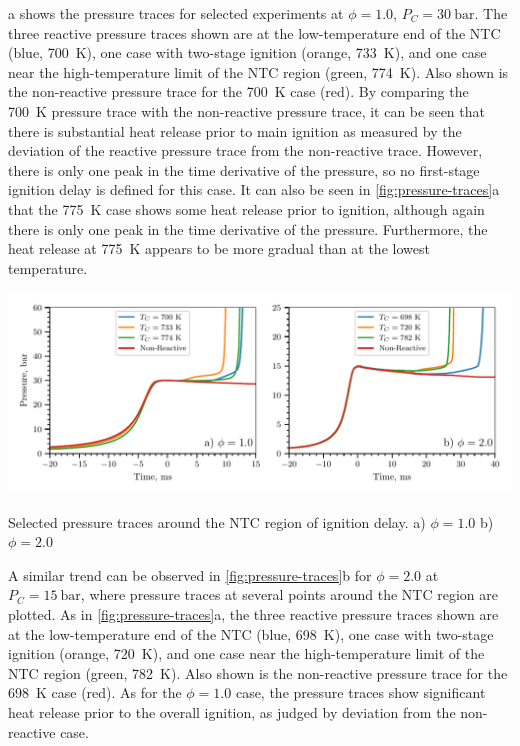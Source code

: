 \documentclass[letterpaper, review]{elsarticle}
\begin{document}
a shows the pressure traces for selected experiments at \(\phi=1.0\),
\(P_C =\SI[number-unit-product={\ }]{30}{\bar}\). The three reactive pressure traces shown are at
the low-temperature end of the NTC (blue, \SI{700}{\K}), one case with two-stage ignition (orange,
\SI{733}{\K}), and one case near the high-temperature limit of the NTC region (green, \SI{774}{\K}).
Also shown is the non-reactive pressure trace for the \SI{700}{\K} case (red). By comparing the
\SI{700}{\K} pressure trace with the non-reactive pressure trace, it can be seen that there is
substantial heat release prior to main ignition as measured by the deviation of the reactive
pressure trace from the non-reactive trace. However, there is only one peak in the time derivative
of the pressure, so no first-stage ignition delay is defined for this case. It can also be seen in
\cref{fig:pressure-traces}a that the \SI{775}{\K} case shows some heat release prior to ignition,
although again there is only one peak in the time derivative of the pressure. Furthermore, the heat
release at \SI{775}{\K} appears to be more gradual than at the lowest temperature.

\begin{center}
    \captionsetup{type=figure}
    \includegraphics[width=\textwidth]{figures/pressure-traces.pdf}
    \caption{Selected pressure traces around the NTC region of ignition delay.
    a) \(\phi=1.0\) b) \(\phi=2.0\)}
    \label{fig:pressure-traces}
\end{center}

A similar trend can be observed in \cref{fig:pressure-traces}b for \(\phi=2.0\) at
\(P_C=\SI{15}{\bar}\), where pressure traces at several points around the NTC region are plotted. As
in \cref{fig:pressure-traces}a, the three reactive pressure traces shown are at the low-temperature
end of the NTC (blue, \SI{698}{\K}), one case with two-stage ignition (orange, \SI{720}{\K}), and
one case near the high-temperature limit of the NTC region (green, \SI{782}{\K}). Also shown is the
non-reactive pressure trace for the \SI{698}{\K} case (red). As for the \(\phi=1.0\) case, the
pressure traces show significant heat release prior to the overall ignition, as judged by deviation
from the non-reactive case.
\end{document}
